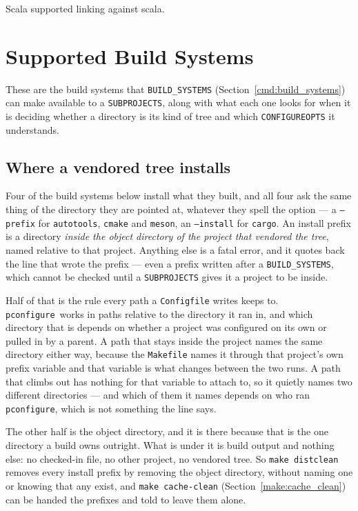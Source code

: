 \documentclass{article}
\newcommand{\pconfigure}{\texttt{pconfigure}}
\begin{document}
Scala supported linking against scala.

\section{Supported Build Systems \label{buildsys}}

These are the build systems that \texttt{BUILD\_SYSTEMS}
(Section~\ref{cmd:build_systems}) can make available to a
\texttt{SUBPROJECTS}, along with what each one looks for when it is
deciding whether a directory is its kind of tree and which
\texttt{CONFIGUREOPTS} it understands.

\subsection{Where a vendored tree installs \label{buildsys:prefix}}

Four of the build systems below install what they built, and all
four ask the same thing of the directory they are pointed at,
whatever they spell the option --- a \texttt{--prefix} for
\texttt{autotools}, \texttt{cmake} and \texttt{meson}, an
\texttt{--install} for \texttt{cargo}.  An install prefix is a directory \emph{inside the
object directory of the project that vendored the tree}, named
relative to that project.  Anything else is a fatal error, and it
quotes back the line that wrote the prefix --- even a prefix written
after a \texttt{BUILD\_SYSTEMS}, which cannot be checked until a
\texttt{SUBPROJECTS} gives it a project to be inside.

Half of that is the rule every path a \texttt{Configfile} writes keeps
to.  \pconfigure\ works in paths relative to the directory it ran in,
and which directory that is depends on whether a project was
configured on its own or pulled in by a parent.  A path that stays
inside the project names the same directory either way, because the
\texttt{Makefile} names it through that project's own prefix variable
and that variable is what changes between the two runs.  A path that
climbs out has nothing for that variable to attach to, so it quietly
names two different directories --- and which of them it names depends
on who ran \pconfigure, which is not something the line says.

The other half is the object directory, and it is there because that
is the one directory a build owns outright.  What is under it is build
output and nothing else: no checked-in file, no other project, no
vendored tree.  So \texttt{make distclean} removes every install
prefix by removing the object directory, without naming one or knowing
that any exist, and \texttt{make cache-clean}
(Section~\ref{make:cache_clean}) can be handed the prefixes and told
to leave them alone.
\end{document}
